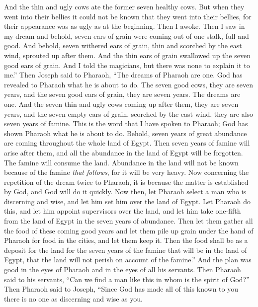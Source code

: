 \begin{biblechapter}
\verse And the thin and ugly cows ate the former seven healthy cows.
\verse But when they went into their bellies it could not be known that they went into their bellies, for their appearance was as ugly as at the beginning. Then I awoke.
\verse Then I saw in my dream and behold, seven ears of grain were coming out of one stalk, full and good.
\verse And behold, seven withered ears of grain, thin and scorched by the east wind, sprouted up after them.
\verse And the thin ears of grain swallowed up the seven good ears of grain. And I told the magicians, but there was none to explain it to me.”
\verse Then Joseph said to Pharaoh, “The dreams of Pharaoh are one. God has revealed to Pharaoh what he is about to do.
\verse The seven good cows, they are seven years, and the seven good ears of grain, they are seven years. The dreams are one.
\verse And the seven thin and ugly cows coming up after them, they are seven years, and the seven empty ears of grain, scorched by the east wind, they are also seven years of famine.
\verse This is the word that I have spoken to Pharaoh; God has shown Pharaoh what he is about to do.
\verse Behold, seven years of great abundance are coming throughout the whole land of Egypt.
\verse Then seven years of famine will arise after them, and all the abundance in the land of Egypt will be forgotten. The famine will consume the land.
\verse Abundance in the land will not be known because of the famine \textit{that follows}, for it will be very heavy.
\verse Now concerning the repetition of the dream twice to Pharaoh, it is because the matter is established by God, and God will do it quickly.
\verse Now then, let Pharaoh select a man who is discerning and wise, and let him set him over the land of Egypt.
\verse Let Pharaoh do this, and let him appoint supervisors over the land, and let him take one-fifth from the land of Egypt in the seven years of abundance.
\verse Then let them gather all the food of these coming good years and let them pile up grain under the hand of Pharaoh for food in the cities, and let them keep it.
\verse Then the food shall be as a deposit for the land for the seven years of the famine that will be in the land of Egypt, that the land will not perish on account of the famine.”
 And the plan was good in the eyes of Pharaoh and in the eyes of all his servants.
\verse Then Pharaoh said to his servants, “Can we find a man like this in whom is the spirit of God?”
\verse Then Pharaoh said to Joseph, “Since God has made all of this known to you there is no one as discerning and wise as you.

\end{biblechapter}
